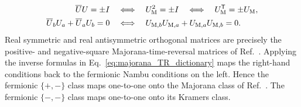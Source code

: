 \documentclass[onecolumn,aps,prb,amsmath,amssymb,superscriptaddress,longbibliography]{revtex4-2}
\newcommand{\trans}{\mathsf{T}}
\begin{document}
\begin{align}
    \overline U U=\pm I
    &\quad\Longleftrightarrow\quad
    U_{\rm M}^2=\pm I
    \quad\Longleftrightarrow\quad
    U_{\rm M}^\trans=\pm U_{\rm M},
    \label{eq:majorana_square_dictionary}\\
    \overline U_bU_a+\overline U_aU_b=0
    &\quad\Longleftrightarrow\quad
    U_{{\rm M},b}U_{{\rm M},a}
    +U_{{\rm M},a}U_{{\rm M},b}=0.
    \label{eq:majorana_anticommutation_dictionary}
\end{align}
Real symmetric and real antisymmetric orthogonal matrices are precisely the positive- and negative-square Majorana-time-reversal matrices of Ref.~\cite{li2016prl}.  Applying the inverse formulas in Eq.~\eqref{eq:majorana_TR_dictionary} maps the right-hand conditions back to the fermionic Nambu conditions on the left.  Hence the fermionic \(\{+,-\}\) class maps one-to-one onto the Majorana class of Ref.~\cite{li2016prl}.  The fermionic \(\{-,-\}\) class maps one-to-one onto its Kramers class.


\end{document}
